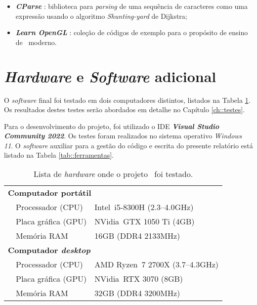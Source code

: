 \begin{itemize}
    \item \textbf{\textit{CParse}} \cite{cparse}: biblioteca para \textit{parsing} de uma sequência de caracteres como uma expressão usando o algoritmo \textit{Shunting-yard} de Dijkstra;
    
    \item \textbf{\textit{Learn OpenGL}} \cite{learnopengl}: coleção de códigos de exemplo para o propósito de ensino de \opengl~moderno.
\end{itemize}


\section{\textit{Hardware} e \textit{Software} adicional}
\label{sec::tecno:hw}

O \textit{software} final foi testado em dois computadores distintos, listados na Tabela \ref{tab::hardware}. Os resultados destes testes serão abordados em detalhe no Capítulo \ref{ch::testes}.

Para o desenvolvimento do projeto, foi utilizado o \ac{IDE} \textbf{\textit{Visual Studio Community 2022}}. Os testes foram realizados no sistema operativo \textit{Windows 11}. O \textit{software} auxiliar para a gestão do código e escrita do presente relatório está listado na Tabela \ref{tab::ferramentas}.

\begin{table}[!p]
	\centering
	\caption[Lista de \textit{hardware} para testes]{Lista de \textit{hardware} onde o projeto \theapp~foi testado.}
	\label{tab::hardware}
	\begin{tabular}{p{1cm} l l}
		\toprule
		\multicolumn{3}{l}{\bfseries Computador portátil} \\
		& Processador (\acs{CPU})   & Intel\registered~i5-8300H (2.3--4.0GHz) \\
		& Placa gráfica (\acs{GPU}) & NVidia\registered~GTX 1050 Ti (4GB) \\
		& Memória \acs{RAM}         & 16GB (DDR4 2133MHz) \\
		\midrule
		\multicolumn{3}{l}{\bfseries Computador \textit{desktop}} \\
		& Processador (\acs{CPU})   & AMD Ryzen\texttrademark~7 2700X (3.7--4.3GHz) \\
		& Placa gráfica (\acs{GPU}) & NVidia\registered~RTX 3070 (8GB) \\
		& Memória \acs{RAM}         & 32GB (DDR4 3200MHz) \\
		\bottomrule
	\end{tabular}
\end{table}


%
